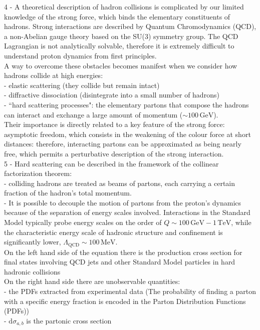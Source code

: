 \documentclass{article}
\begin{document}
4 - A theoretical description of hadron collisions is complicated by our limited knowledge of the strong force, which binds the elementary constituents of hadrons. Strong interactions are described by Quantum Chromodynamics (QCD), a non-Abelian gauge theory based on the SU(3) symmetry group. The QCD Lagrangian is not analytically solvable, therefore it is extremely difficult to understand proton dynamics from first principles. \\
A way to overcome these obstacles becomes manifest when we consider how hadrons collide at high energies: \\
- elastic scattering (they collide but remain intact)\\
- diffractive dissociation (disintegrate into a small number of hadrons) \\
- ``hard scattering processes": the elementary partons that compose the hadrons can interact and exchange a large amount of momentum ($\sim 100 \,\text{GeV}$). \\
Their importance is directly related to a key feature of the strong force: asymptotic freedom, which consists in the weakening of the colour force at short distances: therefore, interacting partons can be approximated as being nearly free, which permits a perturbative description of the strong interaction. \\

5 - Hard scattering can be described in the framework of the collinear factorization theorem: \\
- colliding hadrons are treated as beams of partons, each carrying a certain fraction of the hadron's total momentum. \\
- It is possible to decouple the motion of partons from the proton's dynamics because of the separation of energy scales involved. Interactions in the Standard Model typically probe energy scales on the order of $Q \sim 100  \, \text{GeV} - 1 \, \text{TeV}$, while the characteristic energy scale of hadronic structure and confinement is significantly lower, $\Lambda_{\text{QCD}} \sim 100 \, \text{MeV}$. \\
On the left hand side of the equation there is the production cross section for final states involving QCD jets and other Standard Model particles in hard hadronic collisions \\
On the right hand side there are unobservable quantities: \\
- the PDFs extracted from experimental data (The probability of finding a parton with a specific energy fraction is encoded in the Parton Distribution Functions (PDFs)) \\
- $\mathrm{d}\sigma_{a,b}$ is the partonic cross section \\
\end{document}
